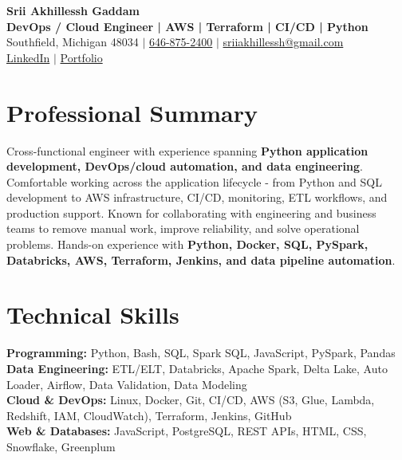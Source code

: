 \documentclass[letterpaper,10pt]{article}
\begin{document}
\fontsize{9.35pt}{10.45pt}\selectfont

\begin{center}
    {\LARGE \textbf{Srii Akhillessh Gaddam}} \\[-1pt]
    \textbf{DevOps / Cloud Engineer | AWS | Terraform | CI/CD | Python} \\[2pt]
    Southfield, Michigan 48034 $|$
    \href{tel:6468752400}{646-875-2400} $|$
    \href{mailto:sriiakhillessh@gmail.com}{sriiakhillessh@gmail.com} \\[1pt]
    \href{https://www.linkedin.com/in/srii-akhiilessh-gaddam-b48668191/}{LinkedIn} $|$
    \href{https://sriiakhillesshg.github.io/portfolio/}{Portfolio}
\end{center}
\vspace{-8pt}

\section{Professional Summary}
\small{Cross-functional engineer with experience spanning \textbf{Python application development, DevOps/cloud automation, and data engineering}. Comfortable working across the application lifecycle - from Python and SQL development to AWS infrastructure, CI/CD, monitoring, ETL workflows, and production support. Known for collaborating with engineering and business teams to remove manual work, improve reliability, and solve operational problems. Hands-on experience with \textbf{Python, Docker, SQL, PySpark, Databricks, AWS, Terraform, Jenkins, and data pipeline automation}.}

\section{Technical Skills}
\small{
\textbf{Programming:} Python, Bash, SQL, Spark SQL, JavaScript, PySpark, Pandas \\
\textbf{Data Engineering:} ETL/ELT, Databricks, Apache Spark, Delta Lake, Auto Loader, Airflow, Data Validation, Data Modeling \\
\textbf{Cloud \& DevOps:} Linux, Docker, Git, CI/CD, AWS (S3, Glue, Lambda, Redshift, IAM, CloudWatch), Terraform, Jenkins, GitHub \\
\textbf{Web \& Databases:} JavaScript, PostgreSQL, REST APIs, HTML, CSS, Snowflake, Greenplum
}
\end{document}
